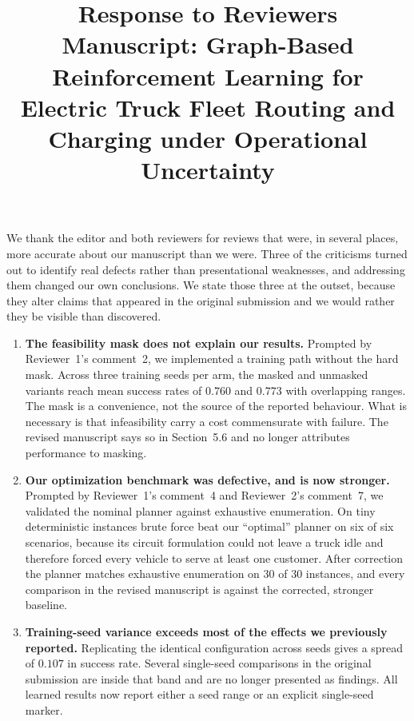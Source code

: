 \documentclass[11pt]{article}
\title{Response to Reviewers\\[2mm]
\large Manuscript: Graph-Based Reinforcement Learning for Electric Truck Fleet
Routing and Charging under Operational Uncertainty}
\date{}
\begin{document}
\maketitle

\noindent We thank the editor and both reviewers for reviews that were, in
several places, more accurate about our manuscript than we were. Three of the
criticisms turned out to identify real defects rather than presentational
weaknesses, and addressing them changed our own conclusions. We state those
three at the outset, because they alter claims that appeared in the original
submission and we would rather they be visible than discovered.

\begin{enumerate}[leftmargin=*]
\item \textbf{The feasibility mask does not explain our results.} Prompted by
Reviewer~1's comment~2, we implemented a training path without the hard mask.
Across three training seeds per arm, the masked and unmasked variants reach mean
success rates of $0.760$ and $0.773$ with overlapping ranges. The mask is a
convenience, not the source of the reported behaviour. What is necessary is that
infeasibility carry a cost commensurate with failure. The revised manuscript
says so in Section~5.6 and no longer attributes performance to masking.

\item \textbf{Our optimization benchmark was defective, and is now stronger.}
Prompted by Reviewer~1's comment~4 and Reviewer~2's comment~7, we validated the
nominal planner against exhaustive enumeration. On tiny deterministic instances
brute force beat our ``optimal'' planner on six of six scenarios, because its
circuit formulation could not leave a truck idle and therefore forced every
vehicle to serve at least one customer. After correction the planner matches
exhaustive enumeration on $30$ of $30$ instances, and every comparison in the
revised manuscript is against the corrected, stronger baseline.

\item \textbf{Training-seed variance exceeds most of the effects we previously
reported.} Replicating the identical configuration across seeds gives a spread
of $0.107$ in success rate. Several single-seed comparisons in the original
submission are inside that band and are no longer presented as findings. All
learned results now report either a seed range or an explicit single-seed
marker.
\end{enumerate}
\end{document}
